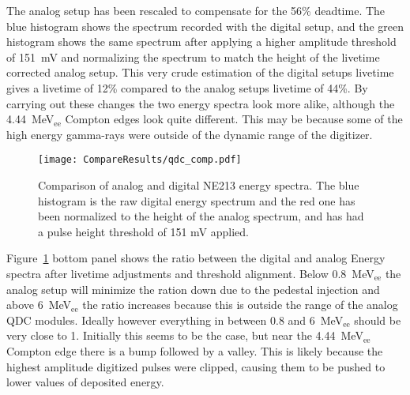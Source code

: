\documentclass[main.tex]{subfiles}
\begin{document}
The analog setup has been rescaled to compensate for the 56\% deadtime. The blue histogram shows the spectrum recorded with the digital setup, and the green histogram shows the same spectrum after applying a higher amplitude threshold of \SI{151}{mV} and normalizing the spectrum to match the height of the livetime corrected analog setup. This very crude estimation of the digital setups livetime gives a livetime of 12\% compared to the analog setups livetime of 44\%. By carrying out these changes the two energy spectra look more alike, although the \SI{4.44}{\MeV}$_\text{ee}$ Compton edges look quite different. This may be because some of the high energy gamma-rays were outside of the dynamic range of the digitizer.

\begin{figure}[h]
    \centering
        \texttt{[image: CompareResults/qdc\_comp.pdf]}
        \caption[Comparison of analog and digital NE213 energy spectra]{Comparison of analog and digital NE213 energy spectra. The blue histogram is the raw digital energy spectrum and the red one has been normalized to the height of the analog spectrum, and has had a pulse height threshold of 151 mV applied.}
    \label{fig:qdc_comp}
\end{figure}

Figure~\ref{fig:qdc_comp} bottom panel shows the ratio between the digital and analog Energy spectra after livetime adjustments and threshold alignment. Below \SI{0.8}{\MeV}$_\text{ee}$ the analog setup will minimize the ration down due to the pedestal injection and above \SI{6}{\MeV}$_\text{ee}$ the ratio increases because this is outside the range of the analog QDC modules. Ideally however everything in between 0.8 and \SI{6}{\MeV}$_\text{ee}$ should be very close to 1. Initially this seems to be the case, but near the \SI{4.44}{\MeV}$_\text{ee}$ Compton edge there is a bump followed by a valley. This is likely because the highest amplitude digitized pulses were clipped, causing them to be pushed to lower values of deposited energy.
\end{document}
